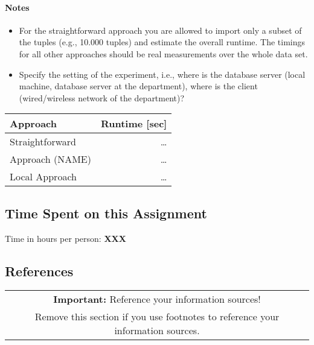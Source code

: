 \documentclass[11pt]{scrartcl}
\begin{document}
\paragraph{Notes}

\begin{itemize}
  \item For the straightforward approach you are allowed to import only a subset of the tuples (e.g., 10.000 tuples) and estimate the overall runtime. The timings for all other approaches should be real measurements over the whole data set.
  \item Specify the setting of the experiment, i.e., where is the database server (local machine, database server at the department), where is the client (wired/wireless network of the department)?
\end{itemize}

\begin{table}[H]
  \centering
  \begin{tabular}{l|r}
    Approach          & Runtime [sec] \tabularnewline
    \hline
    Straightforward   & \ldots \tabularnewline
    Approach (NAME) & \ldots \tabularnewline
    Local Approach & \ldots \tabularnewline
  \end{tabular}
\end{table}

\subsection*{Time Spent on this Assignment}

Time in hours per person: \textbf{XXX}

\subsection*{References}

\begin{table}[H]
  \centering
  \begin{tabular}{c}
    \hline
    \textbf{Important:} Reference your information sources! \tabularnewline
    Remove this section if you use footnotes to reference your information sources. \tabularnewline
    \hline
  \end{tabular}
\end{table}
\end{document}
